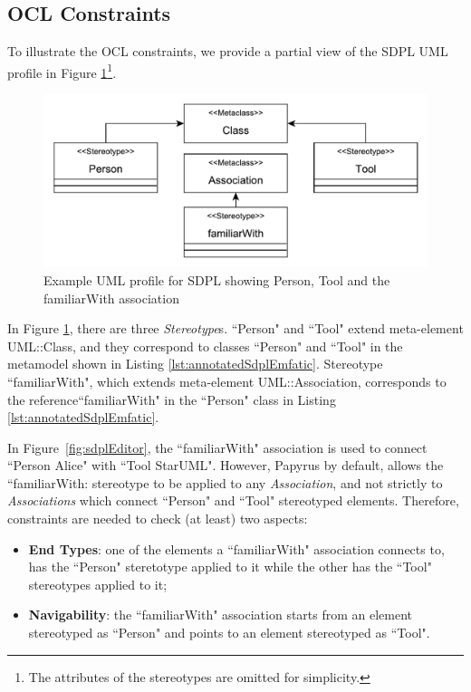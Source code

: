 \subsection{OCL Constraints}
\label{sec:constraints}

To illustrate the OCL constraints, we provide a partial view of the SDPL UML profile in Figure \ref{fig:sample_profile}\footnote{The attributes of the stereotypes are omitted for simplicity.}.

\begin{figure}[ht!]
	\centering
	\includegraphics[width=1\textwidth]{diagrams/example_profile}
	\caption[]{Example UML profile for SDPL showing Person, Tool and the familiarWith association}
	\label{fig:sample_profile}
\end{figure}

In Figure \ref{fig:sample_profile}, there are three \textit{Stereotype}s. ``Person" and ``Tool" extend meta-element UML::Class, and they correspond to classes ``Person" and ``Tool" in the metamodel shown in Listing \ref{lst:annotatedSdplEmfatic}. 
Stereotype ``familiarWith", which extends meta-element UML::Association, corresponds to the reference``familiarWith" in the ``Person" class in Listing \ref{lst:annotatedSdplEmfatic}.

In Figure~\ref{fig:sdplEditor}, the ``familiarWith" association is used to connect ``Person Alice" with ``Tool StarUML". 
However, Papyrus by default, allows the ``familiarWith: stereotype to be applied to any \emph{Association}, and not strictly to \emph{Associations} which connect ``Person" and ``Tool" stereotyped elements. 
Therefore, constraints are needed to check (at least) two aspects:

\begin{itemize}
	\item \textbf{End Types}: one of the elements a ``familiarWith" association connects to, has the ``Person" steretotype applied to it while the other has the ``Tool" stereotypes applied to it;
	\item \textbf{Navigability}: the ``familiarWith" association starts from an element stereotyped as ``Person" and points to an element stereotyped as ``Tool".
\end{itemize}

